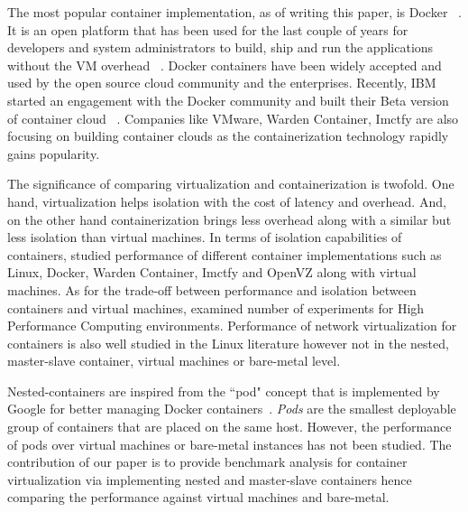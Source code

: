 \documentclass[conference]{IEEEtran}
\begin{document}
The most popular container implementation, as of writing this paper, is Docker 
~\cite{Docker}. It is an open platform that has been used for the last couple of 
years for developers and system administrators to build, ship and run the 
applications without the VM overhead ~\cite{Docker}. Docker containers have been 
widely accepted and used by the open source cloud community and the enterprises. 
Recently, IBM started an engagement with the Docker community 
\cite{IBMContainer} and built their Beta version of container cloud 
~\cite{IBMCloud}. Companies like VMware, Warden Container, Imctfy are also 
focusing on building container clouds as the containerization technology rapidly 
gains popularity.

The significance of comparing virtualization and containerization is twofold.
One hand, virtualization helps isolation with the cost of latency and
overhead.  And, on the other hand containerization brings less overhead along
with a similar but less isolation than virtual machines. In terms of isolation
capabilities of containers, \cite{Dua_2014} studied performance of different
container implementations such as Linux, Docker, Warden Container, Imctfy and
OpenVZ along with virtual machines. As for the trade-off between performance
and isolation between containers and virtual machines, \cite{xavier_2013}
examined number of experiments for High Performance Computing environments.
Performance of network virtualization for containers is also well studied in
the Linux literature \cite{casoni_2013} however not in the nested, master-slave container,
virtual machines or bare-metal level.

Nested-containers are inspired from the ``pod" concept that is implemented by
Google for better managing Docker containers~\cite{google}. {\it Pods} are the 
smallest deployable group of containers that are placed on the same host. 
However, the performance of pods over virtual machines or bare-metal instances 
has not been studied. The contribution of our paper is to provide benchmark 
analysis for container virtualization via implementing nested and master-slave 
containers hence comparing the performance against virtual machines and 
bare-metal.
\end{document}

